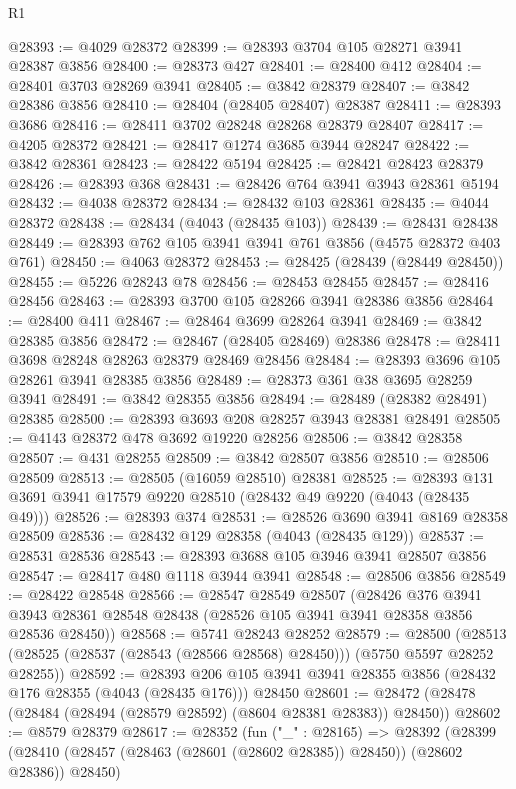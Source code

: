 \begin{lexlean}{R1}
\begin{coremodule}
@28393 := @4029 @28372
@28399 := @28393 @3704 @105 @28271 @3941 @28387 @3856
@28400 := @28373 @427
@28401 := @28400 @412
@28404 := @28401 @3703 @28269 @3941
@28405 := @3842 @28379
@28407 := @3842 @28386 @3856
@28410 := @28404 (@28405 @28407) @28387
@28411 := @28393 @3686
@28416 := @28411 @3702 @28248 @28268 @28379 @28407
@28417 := @4205 @28372
@28421 := @28417 @1274 @3685 @3944 @28247
@28422 := @3842 @28361
@28423 := @28422 @5194
@28425 := @28421 @28423 @28379
@28426 := @28393 @368
@28431 := @28426 @764 @3941 @3943 @28361 @5194
@28432 := @4038 @28372
@28434 := @28432 @103 @28361
@28435 := @4044 @28372
@28438 := @28434 (@4043 (@28435 @103))
@28439 := @28431 @28438
@28449 := @28393 @762 @105 @3941 @3941 @761 @3856 (@4575 @28372 @403 @761)
@28450 := @4063 @28372
@28453 := @28425 (@28439 (@28449 @28450))
@28455 := @5226 @28243 @78
@28456 := @28453 @28455
@28457 := @28416 @28456
@28463 := @28393 @3700 @105 @28266 @3941 @28386 @3856
@28464 := @28400 @411
@28467 := @28464 @3699 @28264 @3941
@28469 := @3842 @28385 @3856
@28472 := @28467 (@28405 @28469) @28386
@28478 := @28411 @3698 @28248 @28263 @28379 @28469 @28456
@28484 := @28393 @3696 @105 @28261 @3941 @28385 @3856
@28489 := @28373 @361 @38 @3695 @28259 @3941
@28491 := @3842 @28355 @3856
@28494 := @28489 (@28382 @28491) @28385
@28500 := @28393 @3693 @208 @28257 @3943 @28381 @28491
@28505 := @4143 @28372 @478 @3692 @19220 @28256
@28506 := @3842 @28358
@28507 := @431 @28255
@28509 := @3842 @28507 @3856
@28510 := @28506 @28509
@28513 := @28505 (@16059 @28510) @28381
@28525 := @28393 @131 @3691 @3941 @17579 @9220 @28510 (@28432 @49 @9220 (@4043 (@28435 @49)))
@28526 := @28393 @374
@28531 := @28526 @3690 @3941 @8169 @28358 @28509
@28536 := @28432 @129 @28358 (@4043 (@28435 @129))
@28537 := @28531 @28536
@28543 := @28393 @3688 @105 @3946 @3941 @28507 @3856
@28547 := @28417 @480 @1118 @3944 @3941
@28548 := @28506 @3856
@28549 := @28422 @28548
@28566 := @28547
    @28549
    @28507
    (@28426
      @376
      @3941
      @3943
      @28361
      @28548
      @28438
      (@28526 @105 @3941 @3941 @28358 @3856 @28536 @28450))
@28568 := @5741 @28243 @28252
@28579 := @28500
    (@28513 (@28525 (@28537 (@28543 (@28566 @28568) @28450))) (@5750 @5597 @28252 @28255))
@28592 := @28393
    @206
    @105
    @3941
    @3941
    @28355
    @3856
    (@28432 @176 @28355 (@4043 (@28435 @176)))
    @28450
@28601 := @28472 (@28478 (@28484 (@28494 (@28579 @28592) (@8604 @28381 @28383)) @28450))
@28602 := @8579 @28379
@28617 := @28352
    (fun ("_" : @28165) =>
    @28392
      (@28399 (@28410 (@28457 (@28463 (@28601 (@28602 @28385)) @28450)) (@28602 @28386)) @28450)

\end{coremodule}
\end{lexlean}
